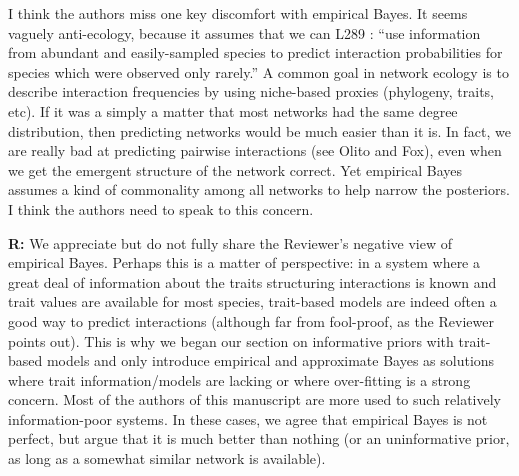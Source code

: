 \documentclass[12pt]{letter}
\newenvironment{refquote}{\bigskip \begin{it}}{\end{it}\smallskip}
\begin{document}
		\begin{refquote}

			I think the authors miss one key discomfort with empirical Bayes. It seems vaguely anti-ecology, because it assumes that we can L289 : “use information from abundant and easily-sampled species to predict interaction probabilities for species which were observed only rarely.”  A common goal in network ecology is to describe interaction frequencies by using niche-based proxies (phylogeny, traits, etc). If it was a simply a matter that most networks had the same degree distribution, then predicting networks would be much easier than it is. In fact, we are really bad at predicting pairwise interactions (see Olito and Fox), even when we get the emergent structure of the network correct. Yet empirical Bayes assumes a kind of commonality among all networks to help narrow the posteriors. I think the authors need to speak to this concern.

		\end{refquote}


		\textbf{R:} We appreciate but do not fully share the Reviewer's negative view of empirical Bayes. Perhaps this is a matter of perspective: in a system where a great deal of information about the traits structuring interactions is known and trait values are available for most species, trait-based models are indeed often a good way to predict interactions (although far from fool-proof, as the Reviewer points out). This is why we began our section on informative priors with trait-based models and only introduce empirical and approximate Bayes as solutions where trait information/models are lacking or where over-fitting is a strong concern. Most of the authors of this manuscript are more used to such relatively information-poor systems. In these cases, we agree that empirical Bayes is not perfect, but argue that it is much better than nothing (or an uninformative prior, as long as a somewhat similar network is available).
\end{document}
